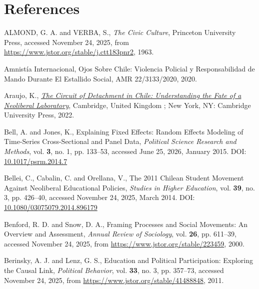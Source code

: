 \documentclass[
  13pt,
]{article}
\newlength{\cslhangindent}
\newenvironment{CSLReferences}[2] %
 {\begin{list}{}{%
  \setlength{\itemindent}{0pt}
  \setlength{\leftmargin}{0pt}
  \setlength{\parsep}{0pt}
  \ifodd #1
   \setlength{\leftmargin}{\cslhangindent}
   \setlength{\itemindent}{-1\cslhangindent}
  \fi
  \setlength{\itemsep}{#2\baselineskip}}}
 {\end{list}}
\begin{document}
\section{References}\label{references}

\protect{}\label{refs}
\begin{CSLReferences}{1}{0}
ALMOND, G. A. and VERBA, S., \emph{The {Civic Culture}}, Princeton
University Press, accessed November 24, 2025, from
\url{https://www.jstor.org/stable/j.ctt183pnr2}, 1963.

Amnistía Internacional, Ojos Sobre {Chile}: {Violencia} Policial y
Responsabilidad de Mando Durante El Estallido Social, AMR 22/3133/2020,
2020.

Araujo, K., \emph{\href{https://doi.org/10.1017/9781009310697}{The
Circuit of Detachment in {Chile}: Understanding the Fate of a Neoliberal
Laboratory}}, Cambridge, United Kingdom ; New York, NY: Cambridge
University Press, 2022.

Bell, A. and Jones, K., Explaining {Fixed Effects}: {Random Effects
Modeling} of {Time-Series Cross-Sectional} and {Panel Data},
\emph{Political Science Research and Methods}, vol. \textbf{3}, no. 1,
pp. 133--53, accessed June 25, 2026, January 2015. DOI:
\href{https://doi.org/10.1017/psrm.2014.7}{10.1017/psrm.2014.7}

Bellei, C., Cabalin, C. and Orellana, V., The 2011 {Chilean} Student
Movement Against Neoliberal Educational Policies, \emph{Studies in
Higher Education}, vol. \textbf{39}, no. 3, pp. 426--40, accessed
November 24, 2025, March 2014. DOI:
\href{https://doi.org/10.1080/03075079.2014.896179}{10.1080/03075079.2014.896179}

Benford, R. D. and Snow, D. A., Framing {Processes} and {Social
Movements}: {An Overview} and {Assessment}, \emph{Annual Review of
Sociology}, vol. \textbf{26}, pp. 611--39, accessed November 24, 2025,
from \url{https://www.jstor.org/stable/223459}, 2000.

Berinsky, A. J. and Lenz, G. S., Education and {Political
Participation}: {Exploring} the {Causal Link}, \emph{Political
Behavior}, vol. \textbf{33}, no. 3, pp. 357--73, accessed November 24,
2025, from \url{https://www.jstor.org/stable/41488848}, 2011.


\end{CSLReferences}
\end{document}
